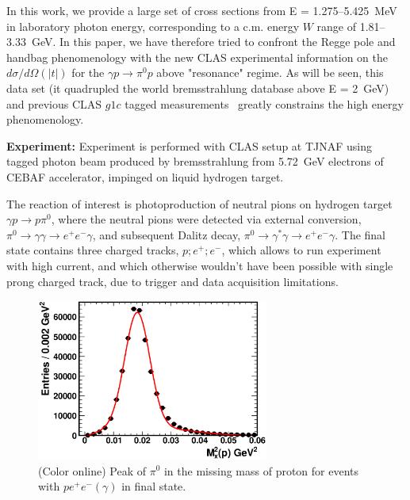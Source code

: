 \documentclass[aps,prc,onecolumn,floatfix,showpacs,preprintnumbers,amsmath,amssymb,superscriptaddress]{revtex4-1}
\begin{document}
In this work, we provide a large set of cross sections from 
E = 1.275--5.425~MeV in laboratory photon energy, corresponding 
to a c.m. energy $W$ range of 1.81--3.33~GeV.  In this paper, 
we have therefore tried to confront the Regge pole and handbag 
phenomenology with the new CLAS experimental information on the 
$d\sigma/d\Omega(|t|)$ for the $\gamma p\to\pi^0p$ above 
"resonance" regime. As will be seen, this data set (it 
quadrupled the world bremsstrahlung database above E = 2~GeV) 
and previous CLAS $g1c$ tagged measurements~\cite{du07} 
greatly constrains the high energy phenomenology.

\textbf{Experiment:} Experiment is performed with CLAS setup 
at TJNAF using tagged photon beam produced by bremsstrahlung 
from 5.72~GeV electrons of CEBAF accelerator, impinged on 
liquid hydrogen target. 

The reaction of interest is 
photoproduction of neutral pions on hydrogen target $\gamma 
p\to p\pi^0$, where the neutral pions were detected via external conversion, 
$\pi^0 \rightarrow \gamma \gamma \rightarrow e^+e^-\gamma$, and subsequent 
Dalitz decay, $\pi^0 \rightarrow \gamma^* \gamma \rightarrow e^+e^-\gamma$. 
The final state contains three charged tracks, $p;e^+;e^-$, which allows to run experiment with high 
current, and which otherwise wouldn't have been possible 
with single prong charged track, due to trigger and data 
acquisition limitations.
\begin{figure}[htb!]
\centerline{
        \includegraphics[width=3in, angle=0]{pi0_peak.eps}}

        \caption {(Color online) Peak of $\pi^0$ in the missing
                mass of proton for events with $pe^+e^-(\gamma)$
                in final state.} \label{fig:pi0_peak}
\end{figure}
\end{document}
